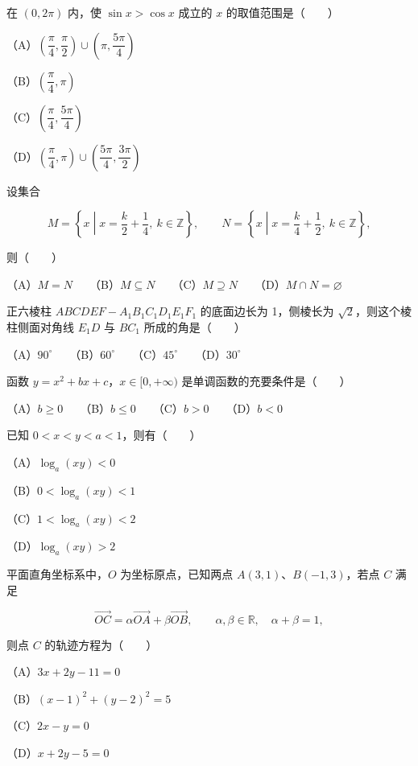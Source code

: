 \begin{question}
在 $(0,2\pi)$ 内，使 $\sin x>\cos x$ 成立的 $x$ 的取值范围是\mbox{（　　）}

（A）$\left(\dfrac\pi4,\dfrac\pi2\right)\cup\left(\pi,\dfrac{5\pi}4\right)$

（B）$\left(\dfrac\pi4,\pi\right)$

（C）$\left(\dfrac\pi4,\dfrac{5\pi}4\right)$

（D）$\left(\dfrac\pi4,\pi\right)\cup\left(\dfrac{5\pi}4,\dfrac{3\pi}2\right)$

\end{question}
\begin{question}
设集合

\nopagebreak[4]
\[
M=\left\{x\middle|x=\frac{k}{2}+\frac14,\ k\in\mathbb Z\right\},\qquad
N=\left\{x\middle|x=\frac{k}{4}+\frac12,\ k\in\mathbb Z\right\},
\]

则\mbox{（　　）}

（A）$M=N$　　（B）$M\subseteq N$　　（C）$M\supseteq N$　　（D）$M\cap N=\varnothing$

\end{question}
\begin{question}
正六棱柱 $ABCDEF-A_1B_1C_1D_1E_1F_1$ 的底面边长为 1，侧棱长为 $\sqrt2$，则这个棱柱侧面对角线 $E_1D$ 与 $BC_1$ 所成的角是\mbox{（　　）}

（A）$90^\circ$　　（B）$60^\circ$　　（C）$45^\circ$　　（D）$30^\circ$

\end{question}
\begin{question}
函数 $y=x^2+bx+c$，$x\in[0,+\infty)$ 是单调函数的充要条件是\mbox{（　　）}

（A）$b\geqslant0$　　（B）$b\leqslant0$　　（C）$b>0$　　（D）$b<0$

\end{question}
\begin{question}
已知 $0<x<y<a<1$，则有\mbox{（　　）}

（A）$\log_a(xy)<0$

（B）$0<\log_a(xy)<1$

（C）$1<\log_a(xy)<2$

（D）$\log_a(xy)>2$

\end{question}
\begin{question}
平面直角坐标系中，$O$ 为坐标原点，已知两点 $A(3,1)\text{、}B(-1,3)$，若点 $C$ 满足

\nopagebreak[4]
\[
\overrightarrow{OC}=\alpha\overrightarrow{OA}+\beta\overrightarrow{OB},
\qquad \alpha,\beta\in\mathbb R,\quad \alpha+\beta=1,
\]

则点 $C$ 的轨迹方程为\mbox{（　　）}

（A）$3x+2y-11=0$

（B）$(x-1)^2+(y-2)^2=5$

（C）$2x-y=0$

（D）$x+2y-5=0$

\end{question}
